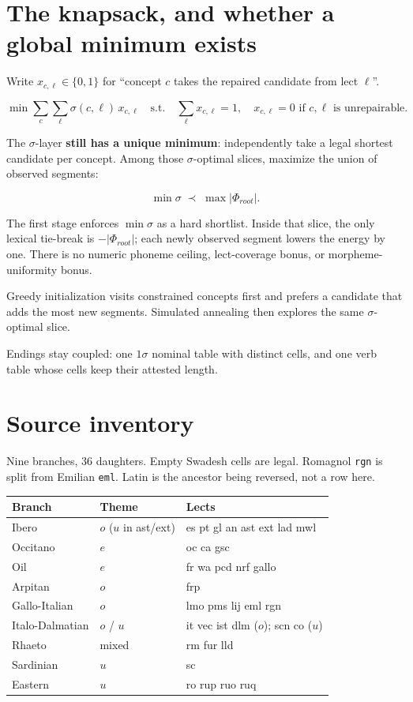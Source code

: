 \documentclass[12pt]{book}
\begin{document}
\section{The knapsack, and whether a global minimum exists}

Write $x_{c,\ell}\in\{0,1\}$ for ``concept $c$ takes the repaired
candidate from lect $\ell$''.

\begin{equation}
\min \sum_{c}\sum_{\ell} \sigma(c,\ell)\, x_{c,\ell}
\quad\text{s.t.}\quad
\sum_{\ell} x_{c,\ell}=1,
\quad x_{c,\ell}=0 \text{ if } c,\ell \text{ is unrepairable.}
\end{equation}

The $\sigma$-layer \textbf{still has a unique minimum}: independently
take a legal shortest candidate per concept. Among those $\sigma$-optimal
slices, maximize the union of observed segments:

\[
\min\sigma \;\prec\; \max|\Phi_{root}|.
\]

The first stage enforces $\min\sigma$ as a hard shortlist. Inside that
slice, the only lexical tie-break is $-|\Phi_{root}|$; each newly observed segment
lowers the energy by one. There is no numeric phoneme ceiling, lect-coverage
bonus, or morpheme-uniformity bonus.

Greedy initialization visits constrained concepts first and prefers a
candidate that adds the most new segments. Simulated annealing then explores
the same $\sigma$-optimal slice.

Endings stay coupled: one $1\sigma$ nominal table with distinct cells,
and one verb table whose cells keep their attested length.

\section{Source inventory}

Nine branches, 36 daughters. Empty Swadesh cells are legal. Romagnol
\texttt{rgn} is split from Emilian \texttt{eml}. Latin is the ancestor
being reversed, not a row here.

\begin{center}
\small
\begin{tabular}{@{}lll@{}}
\toprule
Branch & Theme & Lects \\
\midrule
Ibero & $o$ ($u$ in ast/ext) &
  es pt gl an ast ext lad mwl \\
Occitano & $e$ &
  oc ca gsc \\
Oil & $e$ &
  fr wa pcd nrf gallo \\
Arpitan & $o$ &
  frp \\
Gallo-Italian & $o$ &
  lmo pms lij eml rgn \\
Italo-Dalmatian & $o$ / $u$ &
  it vec ist dlm ($o$); scn co ($u$) \\
Rhaeto & mixed &
  rm fur lld \\
Sardinian & $u$ &
  sc \\
Eastern & $u$ &
  ro rup ruo ruq \\
\bottomrule
\end{tabular}
\end{center}
\end{document}
